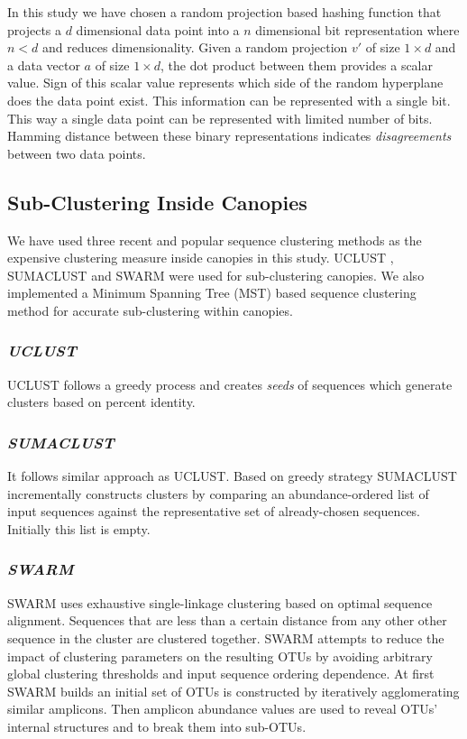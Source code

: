 \documentclass[10pt, conference, compsocconf]{IEEEtran}
\begin{document}
In this study we have chosen a random projection based hashing function that projects a $d$ dimensional data point into a $n$ dimensional bit representation where $n<d$ and reduces dimensionality. Given a random projection $v'$ of size $1 \times d$ and a data vector $a$ of size $1 \times d$, the dot product between them provides a scalar value. Sign of this scalar value represents which side of the random hyperplane does the data point exist. This information can be represented with a single bit. This way a single data point can be represented with limited number of bits. Hamming distance between these binary representations indicates \textit{disagreements} between two data points.

\subsection{\textbf{Sub-Clustering Inside Canopies}}
\label{sub-cluster}
We have used three recent and popular sequence clustering methods as the expensive clustering measure inside canopies in this study. UCLUST \cite{MARuclust}, SUMACLUST \cite{MARSumaclust} and SWARM \cite{MARSwarm2} were used for sub-clustering canopies. We also implemented a Minimum Spanning Tree (MST) based sequence clustering method for accurate sub-clustering within canopies. 

\subsubsection{\textit{UCLUST}}
UCLUST follows a greedy process and creates \textit{seeds} of sequences which generate clusters based on percent identity.

\subsubsection{\textit{SUMACLUST}}
It follows similar approach as UCLUST. Based on greedy strategy SUMACLUST incrementally constructs clusters by comparing an abundance-ordered list of input sequences against the representative set of already-chosen sequences. Initially this list is empty.

\subsubsection{\textit{SWARM}}
SWARM uses exhaustive single-linkage clustering based on optimal sequence alignment. Sequences that are less than a certain distance from any other other sequence in the cluster are clustered together. SWARM attempts to reduce the impact of clustering parameters on the resulting OTUs by avoiding arbitrary global clustering thresholds and input sequence ordering dependence. At first SWARM builds an initial set of OTUs is constructed by iteratively agglomerating similar amplicons. Then amplicon abundance values are used to reveal OTUs’ internal structures and to break them into sub-OTUs.
\end{document}
